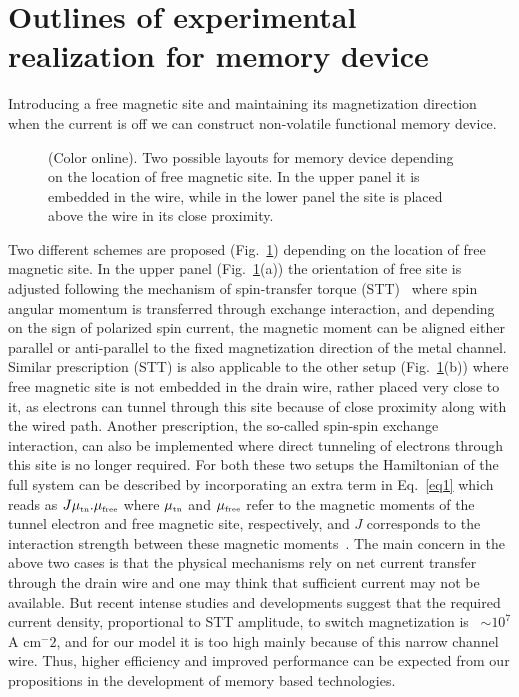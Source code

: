 \documentclass[doublecol]{epl2}
\begin{document}
\section{Outlines of experimental realization for memory device} 

Introducing
a free magnetic site and maintaining its magnetization direction when the
current is off we can construct non-volatile functional memory device.
\begin{figure}[ht]
{\centering {}\par}
\caption{(Color online). Two possible layouts for memory device depending 
on the location of free magnetic site. In the upper panel it is embedded 
in the wire, while in the lower panel the site is placed above the wire 
in its close proximity.}
\label{f6}
\end{figure}
Two different schemes are proposed (Fig.~\ref{f6}) depending on the
location of free magnetic site. In the upper panel (Fig.~\ref{f6}(a)) the
orientation of free site is adjusted following the mechanism of spin-transfer
torque (STT)~\cite{stt1,stt2,stt3} where spin angular momentum is 
transferred through exchange interaction, and depending on the sign of 
polarized spin current, the magnetic moment can be aligned either parallel 
or anti-parallel to the fixed magnetization direction of the metal channel. 
Similar prescription (STT) is also applicable to the other setup 
(Fig.~\ref{f6}(b)) where free magnetic site is not embedded in the drain 
wire, rather placed very close to it, as electrons can tunnel through this 
site because of close proximity along with the wired path. Another 
prescription, the so-called spin-spin exchange interaction, can also be 
implemented where direct tunneling of electrons through this site
is no longer required. For both these two setups the 
Hamiltonian of the full system can be described by incorporating an extra 
term in Eq.~\ref{eq1} which reads as 
$J\mu_{\mbox{\tiny tn}}.\mu_{\mbox{\tiny free}}$ where 
$\mu_{\mbox{\tiny tn}}$ and $\mu_{\mbox{\tiny free}}$ refer to the 
magnetic moments of the tunnel electron and free magnetic site, 
respectively, and $J$ corresponds to the interaction strength between these
magnetic moments~\cite{n1}. The main concern in the above two cases is that 
the physical mechanisms rely on net current transfer through the drain wire 
and one may think that sufficient current may not be available. But recent 
intense studies and
developments suggest that the required current density, proportional to
STT amplitude, to switch magnetization is~\cite{stt1} $\sim 10^7$ A cm$^-2$, 
and for our model it is too high mainly because of this narrow channel wire. 
Thus, higher efficiency and improved performance can be expected from our 
propositions in the development of memory based technologies.
\end{document}
